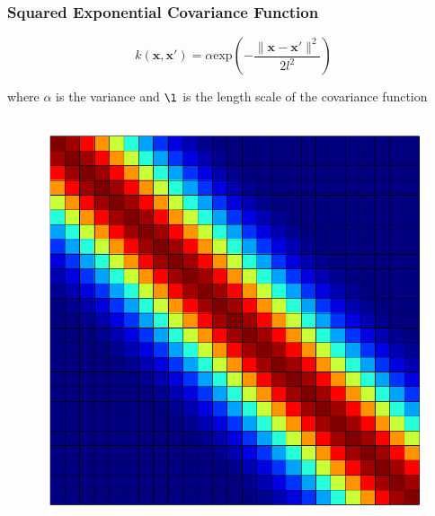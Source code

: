 \documentclass[10pt]{beamer}
\begin{document}
  \begin{frame}
    \frametitle{Squared Exponential Covariance Function}

    \begin{equation*}
      k(\mathbf{x},\mathbf{x}') = \alpha \text{exp} \left( - \frac{\|\mathbf{x} - \mathbf{x}'\|^2}{2l^2} \right)
    \end{equation*}

    where $\alpha$ is the variance and $\l$ is the length scale of the covariance function
    \begin{columns}
      \begin{column}{0.35\textwidth}
        \begin{figure}
          \centering
          \includegraphics[width=\textwidth]{kernelMatrix.png}
        \end{figure}
      \end{column}


\end{columns}
\end{frame}
\end{document}
